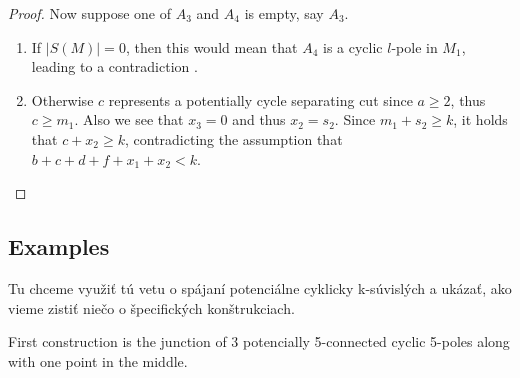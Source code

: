 \documentclass[12pt, twoside]{book}
\begin{document}
\begin{proof}
	Now suppose one of $A_3$ and $A_4$ is empty, say $A_3$.
	
	\begin{enumerate}
		\item If $|S(M)|=0$, then this would mean that $A_4$ is a cyclic $l$-pole in $M_1$, leading to a contradiction .
		\item Otherwise $c$ represents a potentially cycle separating cut since $a\geq 2$, thus $c\geq m_1$. Also we see that $x_3=0$ and thus $x_2=s_2$. Since $m_1+s_2\geq k$, it holds that $c+x_2\geq k$, contradicting the assumption that $b+c+d+f+x_1+x_2<k$.
	\end{enumerate}
\end{proof}

\subsection{Examples}

Tu chceme využiť tú vetu o spájaní potenciálne cyklicky k-súvislých a ukázať, ako vieme zistiť niečo o špecifických konštrukciach.

First construction is the junction of 3 potencially 5-connected cyclic 5-poles along with one point in the middle.
\end{document}
